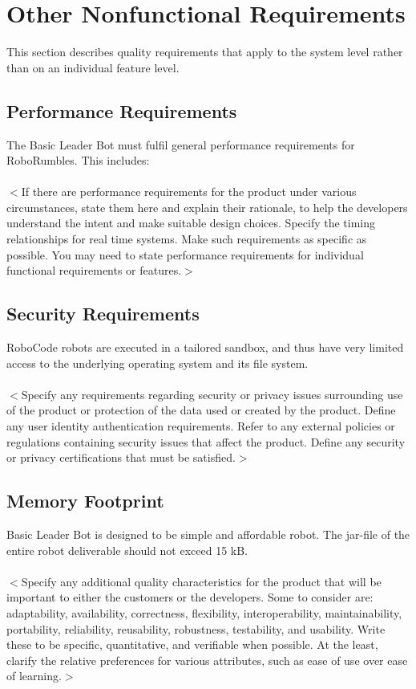 \documentclass{scrreprt}
\begin{document}
\chapter{Other Nonfunctional Requirements}
This section describes quality requirements that apply to the system level rather than on an individual feature level. 

\section{Performance Requirements}
The Basic Leader Bot must fulfil general performance requirements for RoboRumbles. This includes:\\\\

$<$If there are performance requirements for the product under various 
circumstances, state them here and explain their rationale, to help the 
developers understand the intent and make suitable design choices. Specify the 
timing relationships for real time systems. Make such requirements as specific 
as possible. You may need to state performance requirements for individual 
functional requirements or features.$>$

\section{Security Requirements}
RoboCode robots are executed in a tailored sandbox, and thus have very limited access to the underlying operating system and its file system.\\\\

$<$Specify any requirements regarding security or privacy issues surrounding use 
of the product or protection of the data used or created by the product. Define 
any user identity authentication requirements. Refer to any external policies or 
regulations containing security issues that affect the product. Define any 
security or privacy certifications that must be satisfied.$>$

\section{Memory Footprint}
Basic Leader Bot is designed to be simple and affordable robot. The jar-file of the entire robot deliverable should not exceed 15 kB.\\\\

$<$Specify any additional quality characteristics for the product that will be 
important to either the customers or the developers. Some to consider are: 
adaptability, availability, correctness, flexibility, interoperability, 
maintainability, portability, reliability, reusability, robustness, testability, 
and usability. Write these to be specific, quantitative, and verifiable when 
possible. At the least, clarify the relative preferences for various attributes, 
such as ease of use over ease of learning.$>$
\end{document}
